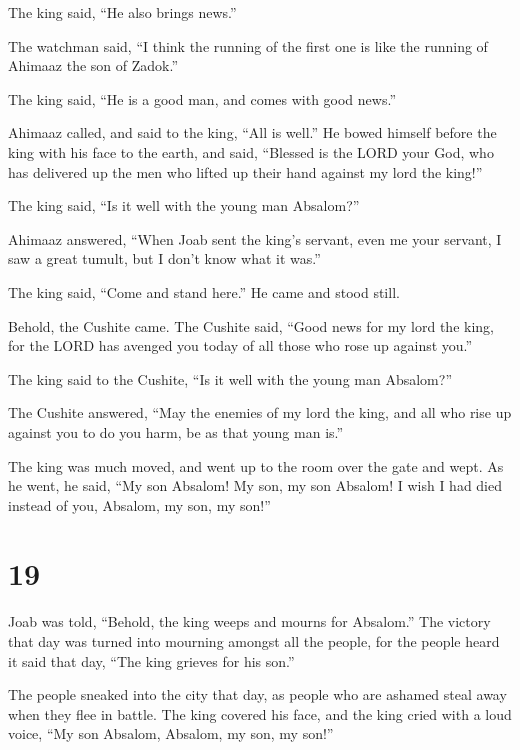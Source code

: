The king said, ``He also brings news.''

 The watchman said, ``I think the running of the first
one is like the running of Ahimaaz the son of Zadok.''

The king said, ``He is a good man, and comes with good news.''

 Ahimaaz called, and said to the king, ``All is well.''
He bowed himself before the king with his face to the earth, and said,
``Blessed is the LORD your God, who has delivered up the men who lifted
up their hand against my lord the king!''

 The king said, ``Is it well with the young man
Absalom?''

Ahimaaz answered, ``When Joab sent the king's servant, even me your
servant, I saw a great tumult, but I don't know what it was.''

 The king said, ``Come and stand here.'' He came and
stood still.

 Behold, the Cushite came. The Cushite said, ``Good news
for my lord the king, for the LORD has avenged you today of all those
who rose up against you.''

 The king said to the Cushite, ``Is it well with the
young man Absalom?''

The Cushite answered, ``May the enemies of my lord the king, and all who
rise up against you to do you harm, be as that young man is.''

 The king was much moved, and went up to the room over
the gate and wept. As he went, he said, ``My son Absalom! My son, my son
Absalom! I wish I had died instead of you, Absalom, my son, my son!''

\hypertarget{section-18}{%
\section{19}\label{section-18}}

 Joab was told, ``Behold, the king weeps and mourns for
Absalom.''  The victory that day was turned into mourning
amongst all the people, for the people heard it said that day, ``The
king grieves for his son.''

 The people sneaked into the city that day, as people who
are ashamed steal away when they flee in battle.  The king
covered his face, and the king cried with a loud voice, ``My son
Absalom, Absalom, my son, my son!''

